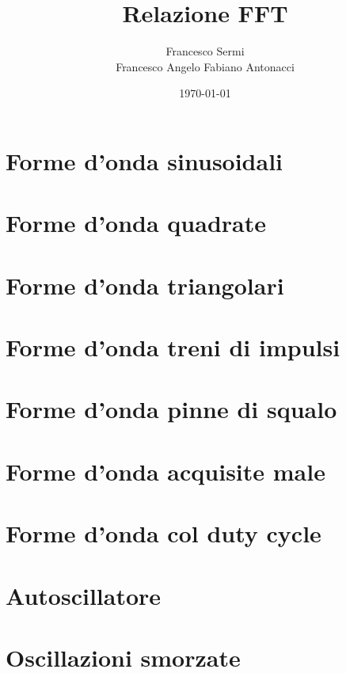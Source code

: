 \documentclass{article}
\author{Francesco Sermi\\Francesco Angelo Fabiano Antonacci}
\date{\today}
\title{Relazione FFT}
\begin{document}
\maketitle
\section{Forme d'onda sinusoidali}

\section{Forme d'onda quadrate}

\section{Forme d'onda triangolari}

\section{Forme d'onda treni di impulsi}

\section{Forme d'onda pinne di squalo}

\section{Forme d'onda acquisite male}

\section{Forme d'onda col duty cycle}

\section{Autoscillatore}

\section{Oscillazioni smorzate}
\end{document}
